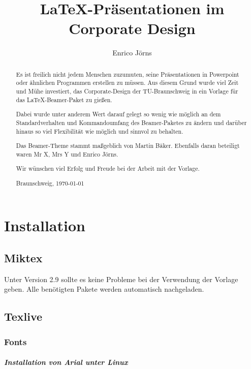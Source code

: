 \documentclass[a4paper,colorscheme=green,TUBStitlepage=picture]{tubsreprt}
\author{Enrico Jörns}
\title{LaTeX-Präsentationen im Corporate Design}
\institute{TU-Braunschweig}
\begin{document}
\maketitle

\tableofcontents
\begin{abstract}
Es ist freilich nicht jedem Menschen zuzumuten, seine Präsentationen in
Powerpoint oder ähnlichen Programmen erstellen zu müssen.
Aus diesem Grund wurde viel Zeit und Mühe investiert, das Corporate-Design der
TU-Braunschweig in ein Vorlage für das \LaTeX-Beamer-Paket zu gießen.\medskip

Dabei wurde unter anderem Wert darauf gelegt so wenig wie möglich an dem
Standardverhalten und Kommandoumfang des Beamer-Paketes zu ändern und darüber
hinaus so viel Flexibilität wie möglich und sinnvol zu behalten.\medskip

Das Beamer-Theme stammt maßgeblich von Martin Bäker. Ebenfalls daran beteiligt
waren Mr X, Mrs Y und Enrico Jörns.%
\bigskip

Wir wünschen viel Erfolg und Freude bei der Arbeit mit der Vorlage.
\bigskip

{\hfill Braunschweig, \today}
\end{abstract}


\chapter{Installation}

\section{Miktex}

Unter Version 2.9 sollte es keine Probleme bei der Verwendung der Vorlage geben.
Alle benötigten Pakete werden automatisch nachgeladen.

\section{Texlive}

\subsection{Fonts}

\paragraph{Installation von Arial unter Linux}
\end{document}
